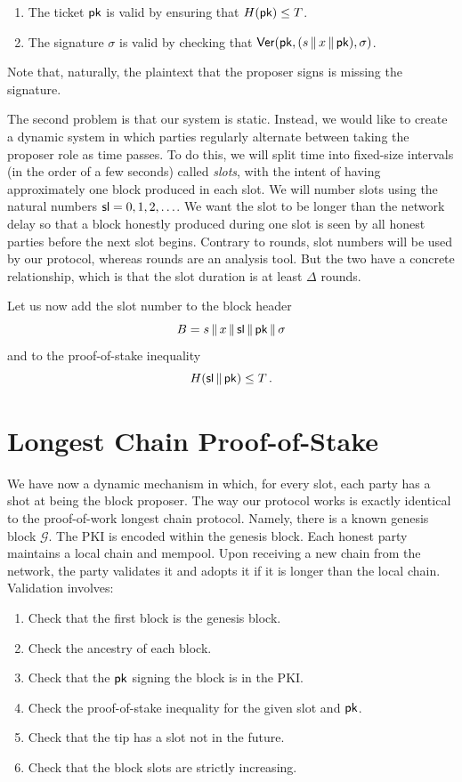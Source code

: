 \begin{enumerate}
  \item The ticket $\mathsf{pk}$ is valid by ensuring that $H(\mathsf{pk}) \leq T$.
  \item The signature $\sigma$ is valid by checking that $\mathsf{Ver}(\mathsf{pk}, (s \,\|\, x \,\|\, \mathsf{pk}), \sigma)$.
\end{enumerate}

Note that, naturally, the plaintext that the proposer signs is missing the signature.

The second problem is that our system is static. Instead,
we would like to create a dynamic system in which parties regularly alternate
between taking the proposer role as time passes. To do this, we will split time
into fixed-size intervals (in the order of a few seconds)
called \emph{slots},
with the intent of
having approximately one block produced in each slot. We will number slots using
the natural numbers $\mathsf{sl} = 0, 1, 2, \ldots$. We want the slot to be longer than the
network delay so that a block honestly produced during one slot is seen by
all honest parties before the next slot begins. Contrary to rounds,
slot numbers will be used by our protocol, whereas rounds are an analysis
tool. But the two have a concrete relationship, which is that the slot duration
is at least $\Delta$ rounds.

Let us now add the slot number to the block header
\[
B = s \,\|\, x \,\|\, \mathsf{sl} \,\|\, \mathsf{pk} \,\|\, \sigma
\]
and to the proof-of-stake inequality
\[
H(\mathsf{sl} \,\|\, \mathsf{pk}) \leq T\,.
\]

\section{Longest Chain Proof-of-Stake}

We have now a dynamic mechanism in which, for every slot, each party has a shot at being
the block proposer. The way our protocol works is exactly identical to the proof-of-work longest
chain protocol. Namely, there is a known genesis block $\mathcal{G}$.
The PKI is encoded within the genesis block.
Each honest party maintains a local chain and mempool. Upon receiving
a new chain from the network, the party validates it and adopts it if it is longer than the local chain.
Validation involves:

\begin{enumerate}
  \item Check that the first block is the genesis block.
  \item Check the ancestry of each block.
  \item Check that the $\mathsf{pk}$ signing the block is in the PKI.
  \item Check the proof-of-stake inequality for the given slot and $\mathsf{pk}$.
  \item Check that the tip has a slot not in the future.
  \item Check that the block slots are strictly increasing.
\end{enumerate}

